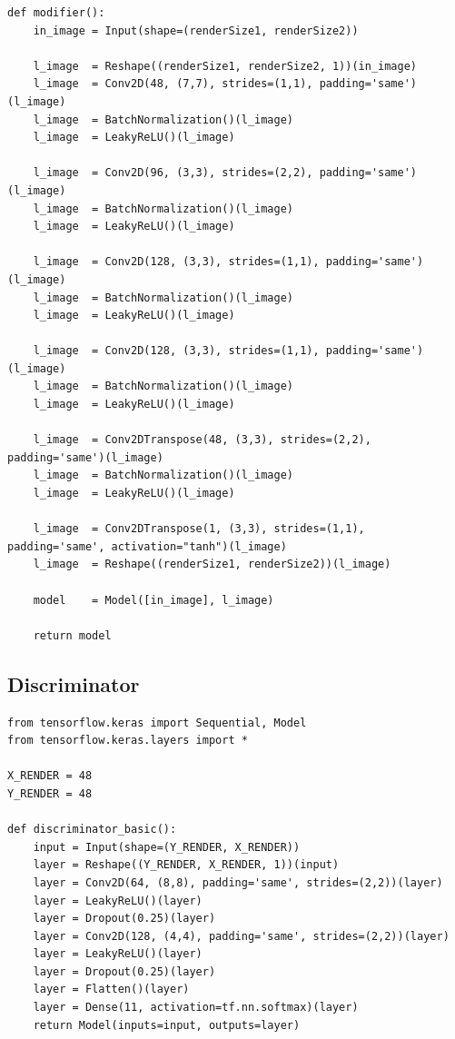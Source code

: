 \documentclass[a4paper,11pt,openany]{book}
\begin{document}
\begin{appendices}
\begin{small}
\begin{verbatim}
def modifier():
    in_image = Input(shape=(renderSize1, renderSize2))

    l_image  = Reshape((renderSize1, renderSize2, 1))(in_image)
    l_image  = Conv2D(48, (7,7), strides=(1,1), padding='same')(l_image)
    l_image  = BatchNormalization()(l_image)
    l_image  = LeakyReLU()(l_image)

    l_image  = Conv2D(96, (3,3), strides=(2,2), padding='same')(l_image)
    l_image  = BatchNormalization()(l_image)
    l_image  = LeakyReLU()(l_image)

    l_image  = Conv2D(128, (3,3), strides=(1,1), padding='same')(l_image)
    l_image  = BatchNormalization()(l_image)
    l_image  = LeakyReLU()(l_image)

    l_image  = Conv2D(128, (3,3), strides=(1,1), padding='same')(l_image)
    l_image  = BatchNormalization()(l_image)
    l_image  = LeakyReLU()(l_image)

    l_image  = Conv2DTranspose(48, (3,3), strides=(2,2), padding='same')(l_image)
    l_image  = BatchNormalization()(l_image)
    l_image  = LeakyReLU()(l_image)

    l_image  = Conv2DTranspose(1, (3,3), strides=(1,1), padding='same', activation="tanh")(l_image)
    l_image  = Reshape((renderSize1, renderSize2))(l_image)

    model    = Model([in_image], l_image)
   
    return model
\end{verbatim}
\end{small}

\subsection*{Discriminator}
\label{sec:orge42e4f5}

\begin{small}
\begin{verbatim}
from tensorflow.keras import Sequential, Model
from tensorflow.keras.layers import *

X_RENDER = 48
Y_RENDER = 48

def discriminator_basic():
    input = Input(shape=(Y_RENDER, X_RENDER))
    layer = Reshape((Y_RENDER, X_RENDER, 1))(input)
    layer = Conv2D(64, (8,8), padding='same', strides=(2,2))(layer)
    layer = LeakyReLU()(layer)
    layer = Dropout(0.25)(layer)
    layer = Conv2D(128, (4,4), padding='same', strides=(2,2))(layer)
    layer = LeakyReLU()(layer)
    layer = Dropout(0.25)(layer)
    layer = Flatten()(layer)
    layer = Dense(11, activation=tf.nn.softmax)(layer)
    return Model(inputs=input, outputs=layer)


\end{verbatim}
\end{small}
\end{appendices}
\end{document}
